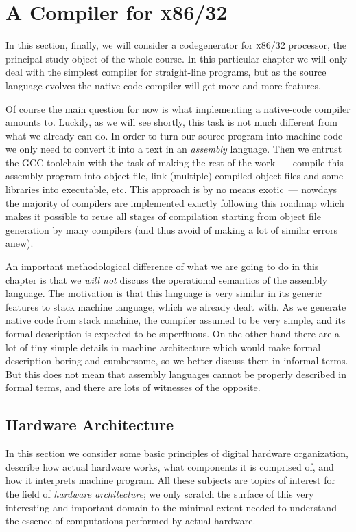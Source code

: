 \chapter{A Compiler for \textsc{x86/32}}

In this section, finally, we will consider a codegenerator for \textsc{x86/32} processor, the principal study
object of the whole course. In this particular chapter we will only deal with the simplest compiler for
straight-line programs, but as the source language evolves the native-code compiler will get more
and more features.

Of course the main question for now is what implementing a native-code compiler amounts to. Luckily, as we will
see shortly, this task is not much different from what we already can do. In order to turn our source program
into machine code we only need to convert it into a text in an \emph{assembly} language. Then we entrust
the \textsc{GCC} toolchain with the task of making the rest of the work~--- compile this assembly program into object file,
link (multiple) compiled object files and some libraries into executable, etc. This approach is by no means
exotic~--- nowdays the majority of compilers are implemented exactly following this roadmap which makes it
possible to reuse all stages of compilation starting from object file generation by many compilers (and thus
avoid of making a lot of similar errors anew).

An important methodological difference of what we are going to do in this chapter is that we \emph{will not}
discuss the operational semantics of the assembly language. The motivation is that this language is very similar
in its generic features to stack machine language, which we already dealt with. As we generate native code from
stack machine, the compiler assumed to be very simple, and its formal description is expected to be superfluous.
On the other hand there are a lot of tiny simple details in machine architecture which would make formal description
boring and cumbersome, so we better discuss them in informal terms. But this does not mean that assembly languages
cannot be properly described in formal terms, and there are lots of witnesses of the opposite.

\section{Hardware Architecture}

In this section we consider some basic principles of digital hardware organization, describe how actual hardware works,
what components it is comprised of, and how it interprets machine program. All these subjects are topics of interest
for the field of \emph{hardware architecture}; we only scratch the surface of this very interesting and important
domain to the minimal extent needed to understand the essence of computations performed by actual hardware.

